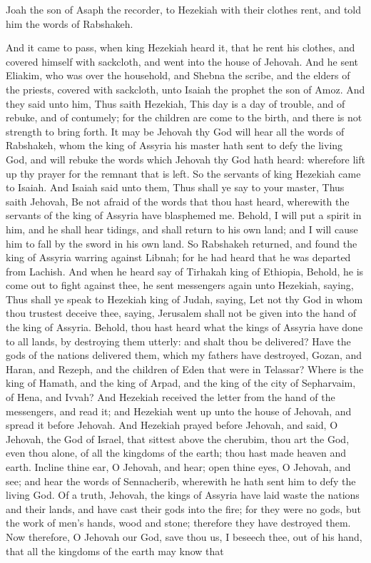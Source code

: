 Joah the son of Asaph the recorder, to Hezekiah with their clothes rent, and told him the words of Rabshakeh. 

And it came to pass, when king Hezekiah heard it, that he rent his clothes, and covered himself with sackcloth, and went into the house of Jehovah. And he sent Eliakim, who was over the household, and Shebna the scribe, and the elders of the priests, covered with sackcloth, unto Isaiah the prophet the son of Amoz. And they said unto him, Thus saith Hezekiah, This day is a day of trouble, and of rebuke, and of contumely; for the children are come to the birth, and there is not strength to bring forth. It may be Jehovah thy God will hear all the words of Rabshakeh, whom the king of Assyria his master hath sent to defy the living God, and will rebuke the words which Jehovah thy God hath heard: wherefore lift up thy prayer for the remnant that is left. So the servants of king Hezekiah came to Isaiah. And Isaiah said unto them, Thus shall ye say to your master, Thus saith Jehovah, Be not afraid of the words that thou hast heard, wherewith the servants of the king of Assyria have blasphemed me. Behold, I will put a spirit in him, and he shall hear tidings, and shall return to his own land; and I will cause him to fall by the sword in his own land.  So Rabshakeh returned, and found the king of Assyria warring against Libnah; for he had heard that he was departed from Lachish. And when he heard say of Tirhakah king of Ethiopia, Behold, he is come out to fight against thee, he sent messengers again unto Hezekiah, saying, Thus shall ye speak to Hezekiah king of Judah, saying, Let not thy God in whom thou trustest deceive thee, saying, Jerusalem shall not be given into the hand of the king of Assyria. Behold, thou hast heard what the kings of Assyria have done to all lands, by destroying them utterly: and shalt thou be delivered? Have the gods of the nations delivered them, which my fathers have destroyed, Gozan, and Haran, and Rezeph, and the children of Eden that were in Telassar? Where is the king of Hamath, and the king of Arpad, and the king of the city of Sepharvaim, of Hena, and Ivvah?  And Hezekiah received the letter from the hand of the messengers, and read it; and Hezekiah went up unto the house of Jehovah, and spread it before Jehovah. And Hezekiah prayed before Jehovah, and said, O Jehovah, the God of Israel, that sittest above the cherubim, thou art the God, even thou alone, of all the kingdoms of the earth; thou hast made heaven and earth. Incline thine ear, O Jehovah, and hear; open thine eyes, O Jehovah, and see; and hear the words of Sennacherib, wherewith he hath sent him to defy the living God. Of a truth, Jehovah, the kings of Assyria have laid waste the nations and their lands, and have cast their gods into the fire; for they were no gods, but the work of men’s hands, wood and stone; therefore they have destroyed them. Now therefore, O Jehovah our God, save thou us, I beseech thee, out of his hand, that all the kingdoms of the earth may know that 